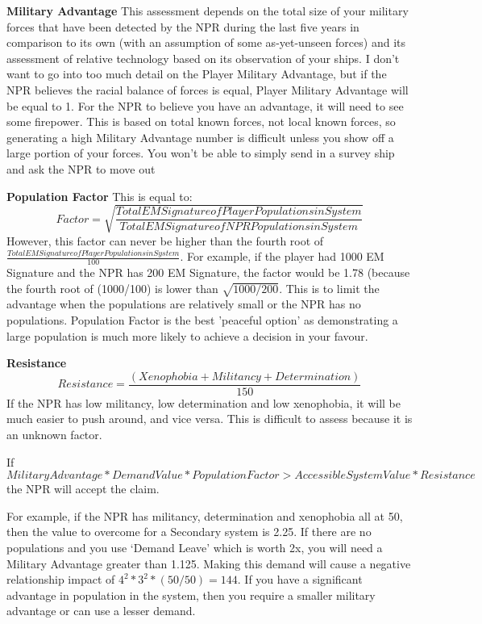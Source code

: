 \documentclass[../Aurora C# unofficial manual.tex]{subfiles}
\begin{document}
	\textbf{Military Advantage}\newline
	This assessment depends on the total size of your military forces that have been detected by the NPR during the last five years in comparison to its own (with an assumption of some as-yet-unseen forces) and its assessment of relative technology based on its observation of your ships. I don't want to go into too much detail on the Player Military Advantage, but if the NPR believes the racial balance of forces is equal, Player Military Advantage will be equal to 1. For the NPR to believe you have an advantage, it will need to see some firepower. This is based on total known forces, not local known forces, so generating a high Military Advantage number is difficult unless you show off a large portion of your forces. You won't be able to simply send in a survey ship and ask the NPR to move out
	
	\textbf{Population Factor}\newline
	This is equal to:
	\[ Factor = \sqrt{\frac{Total EM Signature of Player Populations in System}{Total EM Signature of NPR Populations in System}} \]
	However, this factor can never be higher than the fourth root of \( \frac{Total EM Signature of Player Populations in System}{100} \). For example, if the player had 1000 EM Signature and the NPR has 200 EM Signature, the factor would be 1.78 (because the fourth root of (1000/100) is lower than \( \sqrt{1000 / 200} \). This is to limit the advantage when the populations are relatively small or the NPR has no populations. Population Factor is the best ’peaceful option’ as demonstrating a large population is much more likely to achieve a decision in your favour.
	
	\textbf{Resistance}\newline
	\[ Resistance = \frac{(Xenophobia + Militancy + Determination)}{150} \]
	If the NPR has low militancy, low determination and low xenophobia, it will be much easier to push around, and vice versa. This is difficult to assess because it is an unknown factor.
	
	If
	\[ Military Advantage * Demand Value * Population Factor > Accessible System Value * Resistance \]
	the NPR will accept the claim.
	
	For example, if the NPR has militancy, determination and xenophobia all at 50, then the value to overcome for a Secondary system is 2.25. If there are no populations and you use ‘Demand Leave’ which is worth 2x, you will need a Military Advantage greater than 1.125. Making this demand will cause a negative relationship impact of \( 4^{2} * 3^{2} * (50/50) = 144 \). If you have a significant advantage in population in the system, then you require a smaller military advantage or can use a lesser demand.
	
\end{document}
